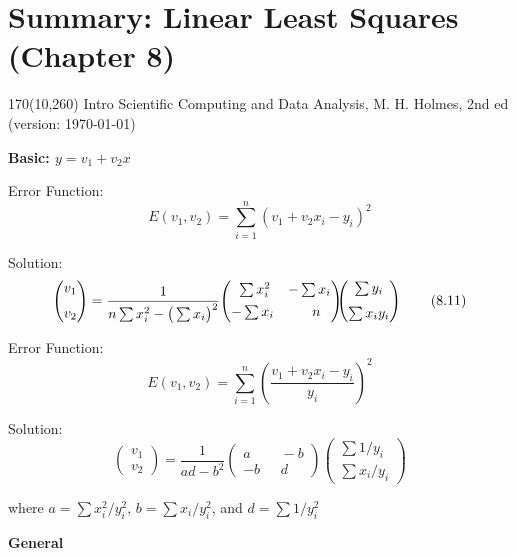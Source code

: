 \documentclass[12pt]{article}
\begin{document}
\pagestyle{empty}

\section*{Summary: Linear Least Squares (Chapter 8)}

\begin{textblock}{170}(10,260)
\noindent \textsf{{\small Intro Scientific Computing and Data Analysis, M. H. Holmes, 2nd ed (version: \today)}}
\end{textblock}

\bigskip\bigskip\noindent
\textbf{Basic: $y=v_1+v_2x$}

\bigskip\noindent
Error Function:
\[
E(v_1,v_2) = \sum_{i=1}^n (v_1+v_2x_i - y_i)^2
\tag{8.9}
\]

Solution:
\[
\begin{pmatrix}
v_1  \medskip\\
v_2
\end{pmatrix}
=
\frac{1}{n\sum x_i^2 - \big (\sum x_i \big)^2} \!
\begin{pmatrix}
\,\, \sum x_i^2 & -\sum x_i  \\[0.4em]
-\sum x_i & \quad n 
\end{pmatrix}
\!\!\!
\begin{pmatrix}
\sum  y_i  \medskip\\
\sum  x_iy_i 
\end{pmatrix}
\tag{8.11}
\]

\bigskip\bigskip\noindent
Error Function:
\[
E(v_1,v_2) = \sum_{i=1}^n \! \left ( \frac{v_1+v_2x_i - y_i}{y_i} \right ) ^2
\tag{Exercise 8.17}
\]

Solution:
\[
\begin{pmatrix}
v_1  \\[0.3em]
v_2
\end{pmatrix}
=
\frac{1}{ad-b^2} \!
\begin{pmatrix}
a   \,\,&\,\, -b  \\[0.3em]
-b \,\,&\,\, d
\end{pmatrix}
 \!\!
\begin{pmatrix}
\sum 1/y_i  \\[0.3em]
\sum  x_i/y_i 
\end{pmatrix}
\]

\bigskip
\hspace{1in} where $a=\sum x_i^2/y_i^2$, $b=\sum x_i/y_i^2$, and $d=\sum 1/y_i^2$


\bigskip\bigskip\bigskip\noindent
\textbf{General} 
\end{document}
